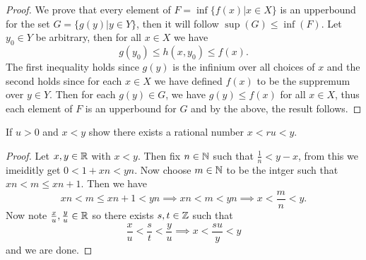 \begin{proof}
    We prove that every element of $F = \inf\{f(x) | x \in X\}$ is an upperbound for the set $G = \{g(y)| y \in Y\}$, then it will follow $\sup(G) \leq \inf(F)$. 
    Let $y_0 \in Y$ be arbitrary, then for all $x \in X$ we have 
    \[g(y_0) \leq h(x, y_0) \leq f(x).\]
    The first inequality holds since $g(y)$ is the infinium over all choices of $x$ and the second holds since for each $x \in X$ we have defined $f(x)$ to be the suppremum over $y \in Y$. 
    Then for each $g(y) \in G$, we have $g(y) \leq f(x)$ for all $x \in X$, thus each element of $F$ is an upperbound for $G$ and by the above, the result follows. 
\end{proof}

\question 
If $u > 0$ and $x < y$ show there exists a rational number $x < ru< y$. 


\begin{proof}
    Let $x, y \in \mathbb{R}$ with $x < y$. Then fix $n \in \mathbb{N}$ such that $\frac{1}{n} < y - x$, from this we imeiditly get $0 < 1 + xn < yn$. Now choose 
    $m \in \mathbb{N}$ to be the intger such that $xn < m \leq xn + 1$. Then we have 
    \[xn < m \leq xn + 1 < yn \implies xn < m < yn \implies x < \frac{m}{n} < y.\]
    Now note $\frac{x}{u}, \frac{y}{u} \in \mathbb{R}$ so there exists $s, t \in \mathbb{Z}$ such that 
    \[\frac{x}{u} < \frac{s}{t} < \frac{y}{u} \implies x < \frac{su}{y} < y \]
    and we are done. 
\end{proof}
    
